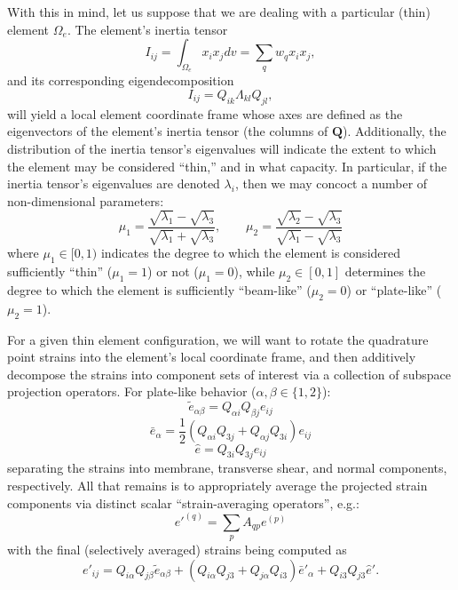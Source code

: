 \documentclass[11pt]{article} %
\begin{document}
With this in mind, let us suppose that we are dealing with a particular (thin) element $\Omega_e$. The element's inertia tensor
\begin{equation}
	I_{ij} = \int_{\Omega_e} x_i x_j dv = \sum_q w_q x_i x_j,
\end{equation}
and its corresponding eigendecomposition
\begin{equation}
	I_{ij} = Q_{ik} \Lambda_{kl} Q_{jl},
\end{equation}
will yield a local element coordinate frame whose axes are defined as the eigenvectors of the element's inertia tensor (the columns of $\mathbf{Q}$). Additionally, the distribution of the inertia tensor's eigenvalues will indicate the extent to which the element may be considered ``thin,'' and in what capacity. In particular, if the inertia tensor's eigenvalues are denoted $\lambda_i$, then we may concoct a number of non-dimensional parameters:
\begin{equation}
	\mu_1 = \frac{\sqrt{\lambda_1} - \sqrt{\lambda_3}}{\sqrt{\lambda_1} + \sqrt{\lambda_3}}, \qquad \mu_2 = \frac{\sqrt{\lambda_2} - \sqrt{\lambda_3}}{\sqrt{\lambda_1} - \sqrt{\lambda_3}}
\end{equation}
where $\mu_1 \in [0,1)$ indicates the degree to which the element is considered sufficiently ``thin'' ($\mu_1 = 1$) or not ($\mu_1 = 0$), while $\mu_2 \in [0,1]$ determines the degree to which the element is sufficiently ``beam-like'' ($\mu_2 = 0$) or ``plate-like'' ($\mu_2 = 1$).

For a given thin element configuration, we will want to rotate the quadrature point strains into the element's local coordinate frame, and then additively decompose the strains into component sets of interest via a collection of subspace projection operators. For plate-like behavior ($\alpha, \beta \in \{1, 2\}$):
\begin{equation}
	\tilde{e}_{\alpha \beta} = Q_{\alpha i} Q_{\beta j} e_{ij}
\end{equation}
\begin{equation}
	\bar{e}_{\alpha} = \frac{1}{2} (Q_{\alpha i} Q_{3 j} + Q_{\alpha j} Q_{3 i}) e_{ij}
\end{equation}
\begin{equation}
	\hat{e} = Q_{3 i} Q_{3 j} e_{ij}
\end{equation}
separating the strains into membrane, transverse shear, and normal components, respectively. All that remains is to appropriately average the projected strain components via distinct scalar ``strain-averaging operators'', e.g.:
\begin{equation}
	e'^{(q)} = \sum_p A_{qp} e^{(p)}
\end{equation}
with the final (selectively averaged) strains being computed as
\begin{equation}
	e'_{ij} = Q_{i \alpha} Q_{j \beta} \tilde{e}_{\alpha \beta} + (Q_{i \alpha} Q_{j 3} + Q_{j \alpha} Q_{i 3}) \bar{e}'_{\alpha} + Q_{i 3} Q_{j 3} \hat{e}'.
\end{equation}
\end{document}
